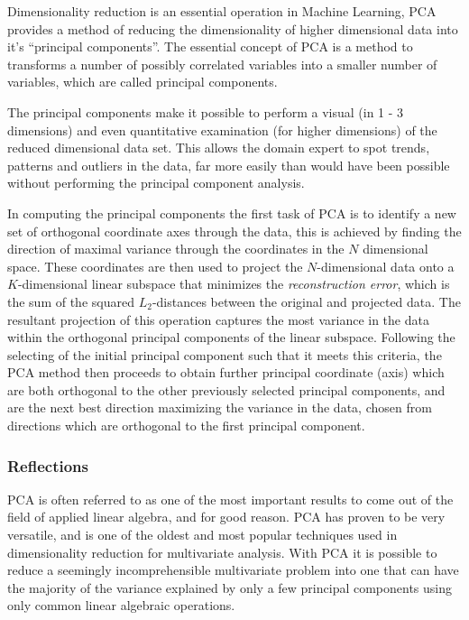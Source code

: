 \documentclass{article}
\begin{document}
Dimensionality reduction is an essential operation in Machine Learning, PCA provides a method of reducing the dimensionality of higher dimensional data into it's ``principal components''. The essential concept of PCA is a method to transforms a number of possibly correlated variables into a smaller number of variables, which are called principal components\cite{richardson2009principal, abdi2010principal}.

The principal components make it possible to perform a visual (in 1 - 3 dimensions) and even quantitative examination (for higher dimensions) of the reduced dimensional data set. This allows the domain expert to spot trends, patterns and outliers in the data, far more easily than would have been possible without performing the principal component analysis\cite{richardson2009principal}.

In computing the principal components the first task of PCA is to identify a new set of orthogonal coordinate axes through the data, this is achieved by finding the direction of maximal variance through the coordinates in the $N$ dimensional space\cite{richardson2009principal}. These coordinates are then used to project the $N$-dimensional data onto a $K$-dimensional linear subspace that minimizes the \emph{reconstruction error}, which is the sum of the squared $L_2$-distances between the original and projected data. The resultant projection of this operation captures the most variance in the data within the orthogonal principal components of the linear subspace\cite{richardson2009principal, abdi2010principal, mohri2012foundations}.  
Following the selecting of the initial principal component such that it meets this criteria, the PCA method then proceeds to obtain further principal coordinate (axis) which are both orthogonal to the other previously selected principal components, and are the next best direction maximizing the variance in the data, chosen from directions which are orthogonal to the first principal component\cite{richardson2009principal, mohri2012foundations}.


\subsubsection{Reflections}

PCA is often referred to as one of the most important results to come out of the field of applied linear algebra\cite{richardson2009principal}, and for good reason. PCA has proven to be very versatile, and is one of the oldest and most popular techniques used in dimensionality reduction for multivariate analysis\cite{abdi2010principal}. With PCA it is possible to reduce a seemingly incomprehensible multivariate problem into one that can have the majority of the variance explained by only a few principal components using only common linear algebraic operations\cite{richardson2009principal}.
\end{document}
